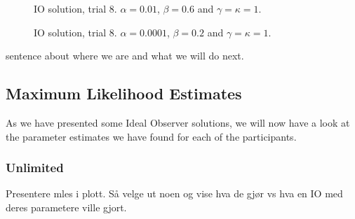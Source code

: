 \begin{figure}
    \centering
     \begin{minipage}[t]{0.45\textwidth}
        \centering
        \scalebox{0.7}{}
        \caption[IO solution, trial 8. $\alpha=0.01$, $\beta=0.6$ and $\gamma=\kappa=1$.]{IO solution, trial 8. $\alpha=0.01$, $\beta=0.6$ and $\gamma=\kappa=1$.}
        \label{fig:trial8_IO_a0.01_b0.6_gk1}
     \end{minipage}\hfill
     \begin{minipage}[t]{0.45\textwidth}
        \centering
        \scalebox{0.7}{}
        \caption[IO solution, trial 8. $\alpha=0.0001$, $\beta=0.2$ and $\gamma=\kappa=1$.]{IO solution, trial 8. $\alpha=0.0001$, $\beta=0.2$ and $\gamma=\kappa=1$.}
        \label{fig:trial8_IO_a0.0001_b0.2_gk1}
     \end{minipage}
\end{figure}




sentence about where we are and what we will do next. 






\subsection{Maximum Likelihood Estimates}
As we have presented some Ideal Observer solutions, we will now have a look at the parameter estimates we have found for each of the participants. 


\subsubsection{Unlimited}
Presentere mles i plott. Så velge ut noen og vise hva de gjør vs hva en IO med deres parametere ville gjort. 

